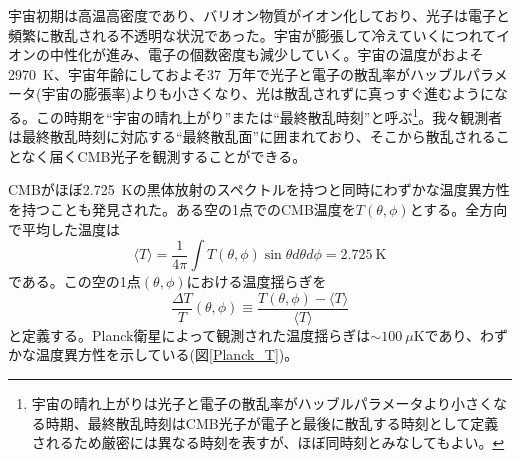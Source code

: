 宇宙初期は高温高密度であり、バリオン物質がイオン化しており、光子は電子と頻繁に散乱される不透明な状況であった。宇宙が膨張して冷えていくにつれてイオンの中性化が進み、電子の個数密度も減少していく。宇宙の温度がおよそ\SI{2970}{K}、宇宙年齢にしておよそ\SI{37}{万年}で光子と電子の散乱率がハッブルパラメータ(宇宙の膨張率)よりも小さくなり、光は散乱されずに真っすぐ進むようになる。この時期を``宇宙の晴れ上がり''または``最終散乱時刻''と呼ぶ\footnote{宇宙の晴れ上がりは光子と電子の散乱率がハッブルパラメータより小さくなる時期、最終散乱時刻はCMB光子が電子と最後に散乱する時刻として定義されるため厳密には異なる時刻を表すが、ほぼ同時刻とみなしてもよい。}。我々観測者は最終散乱時刻に対応する``最終散乱面''に囲まれており、そこから散乱されることなく届くCMB光子を観測することができる。

CMBがほぼ\SI{2.725}{K}の黒体放射のスペクトルを持つと同時にわずかな温度異方性を持つことも発見された。ある空の1点でのCMB温度を$T(\theta,\phi)$とする。全方向で平均した温度は
\begin{equation}
  \langle T \rangle = \frac{1}{4\pi}\int T(\theta,\phi)\sin\theta d\theta d\phi = \SI{2.725}{\mathrm{K}}
\end{equation}
である。この空の1点$(\theta,\phi)$における温度揺らぎを
\begin{equation}
  \frac{\Delta T}{T}(\theta,\phi) \equiv \frac{T(\theta,\phi) - \langle T \rangle}{\langle T \rangle}
\end{equation}
と定義する。Planck衛星によって観測された温度揺らぎ\cite{Planck_T}は$\sim \SI{100}{\mu\mathrm{K}}$であり、わずかな温度異方性を示している(図\ref{Planck_T})。

